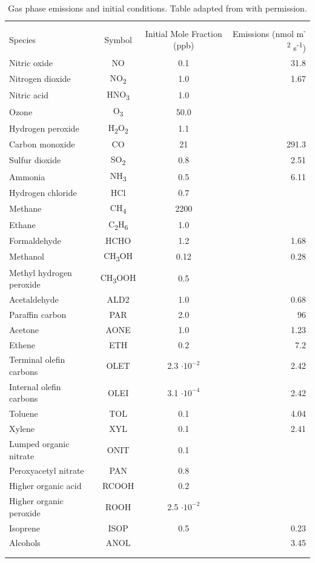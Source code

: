 \begin{table}[h]
\centering
\caption{Gas phase emissions and initial conditions. Table adapted from \cite{riemer_simulating_2009} with permission.}
\begin{tabular*}{\linewidth}{@{\extracolsep{\fill}} lccr}
\\[-2ex]\hline 
     \hline \\[-2ex] Species & Symbol & Initial Mole Fraction (ppb) & Emissions (nmol m\textsuperscript{-2} s\textsuperscript{-1}) \\
\midrule
Nitric oxide & NO & 0.1 & 31.8 \\
Nitrogen dioxide & NO\textsubscript{2} & 1.0 & 1.67 \\
Nitric acid & HNO\textsubscript{3} & 1.0 & \\
Ozone & O\textsubscript{3} & 50.0 & \\
Hydrogen peroxide & H\textsubscript{2}O\textsubscript{2} & 1.1 & \\
Carbon monoxide & CO & 21 & 291.3 \\
Sulfur dioxide & SO\textsubscript{2} & 0.8 & 2.51 \\
Ammonia & NH\textsubscript{3} & 0.5 & 6.11 \\
Hydrogen chloride & HCl & 0.7 & \\
Methane & CH\textsubscript{4} & 2200 & \\
Ethane & C\textsubscript{2}H\textsubscript{6} & 1.0 & \\
Formaldehyde & HCHO & 1.2 & 1.68 \\
Methanol & CH\textsubscript{3}OH & 0.12 & 0.28 \\
Methyl hydrogen peroxide & CH\textsubscript{3}OOH & 0.5 & \\
Acetaldehyde & ALD2 & 1.0 & 0.68 \\
Paraffin carbon & PAR & 2.0 & 96 \\
Acetone & AONE & 1.0 & 1.23 \\
Ethene & ETH & 0.2 & 7.2 \\
Terminal olefin carbons & OLET & 2.3 \(\cdot 10^{-2}\) & 2.42 \\
Internal olefin carbons & OLEI & 3.1 \(\cdot 10^{-4}\) & 2.42 \\
Toluene & TOL & 0.1 & 4.04 \\
Xylene & XYL & 0.1 & 2.41 \\
Lumped organic nitrate & ONIT & 0.1 & \\
Peroxyacetyl nitrate & PAN & 0.8 & \\
Higher organic acid & RCOOH & 0.2 & \\
Higher organic peroxide & ROOH & 2.5 \(\cdot 10^{-2}\) & \\
Isoprene & ISOP & 0.5 & 0.23 \\
Alcohols & ANOL & & 3.45 \\
\\[-2ex]\hline 
     \hline \\[-2ex]
\end{tabular*}
\label{table:gas_emiss_ics}
\end{table}

